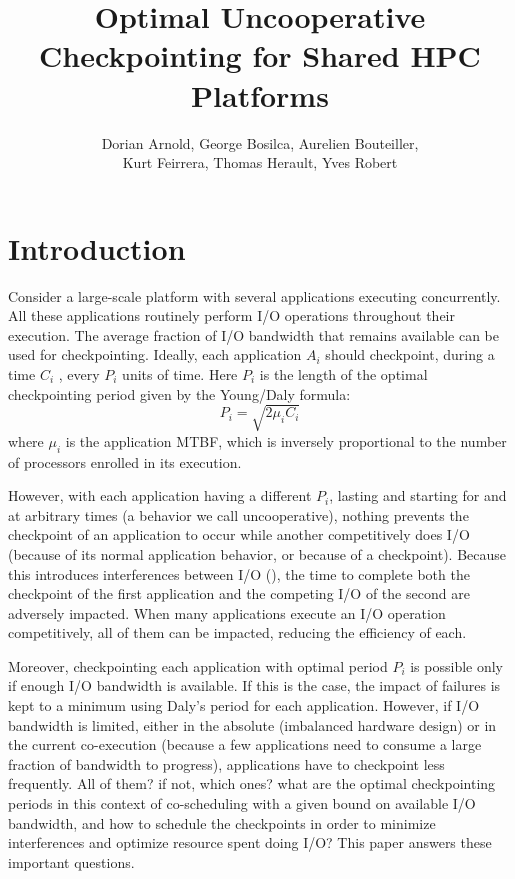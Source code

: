 \documentclass{article}
\author{Dorian Arnold, George Bosilca, Aurelien Bouteiller,\\
 Kurt Feirrera, Thomas Herault, Yves Robert}
\title{Optimal Uncooperative Checkpointing for Shared HPC Platforms}
\begin{document}
\maketitle

\section{Introduction}

Consider a large-scale platform with several applications executing
concurrently. All these applications routinely perform I/O operations
throughout their execution. The average fraction of I/O bandwidth that
remains available can be used for checkpointing. Ideally, each application $A_{i}$
should checkpoint, during a time $C_{i}$ , 
every $P_{i}$ units of time. Here $P_{i}$ is the length of the
optimal checkpointing period given by the Young/Daly formula:
$$P_{i} = \sqrt{2 \mu_{i} C_{i}}$$
where $\mu_{i}$ is the application MTBF, which is inversely
proportional to the number of processors enrolled in its execution.
 
However, with each application having a different $P_{i}$, lasting and
starting for and at arbitrary times (a behavior we call
uncooperative), nothing prevents the checkpoint of an application to
occur while another competitively does I/O (because of its normal
application behavior, or because of a checkpoint). Because this
introduces interferences between I/O (\cite{interference}), the time
to complete both the checkpoint of the first application and the
competing I/O of the second are adversely impacted. When many
applications execute an I/O operation competitively, all of them can
be impacted, reducing the efficiency of each.

Moreover, checkpointing each application with optimal period $P_{i}$
is possible only if enough I/O bandwidth is available. If this is the
case, the impact of failures is kept to a minimum using Daly's period
for each application.  However, if I/O bandwidth is limited, either in
the absolute (imbalanced hardware design) or in the current
co-execution (because a few applications need to consume a large
fraction of bandwidth to progress), applications have to checkpoint
less frequently.  All of them? if not, which ones? what are the
optimal checkpointing periods in this context of co-scheduling with a
given bound on available I/O bandwidth, and how to schedule the
checkpoints in order to minimize interferences and optimize resource
spent doing I/O? This paper answers these important questions.
\end{document}
